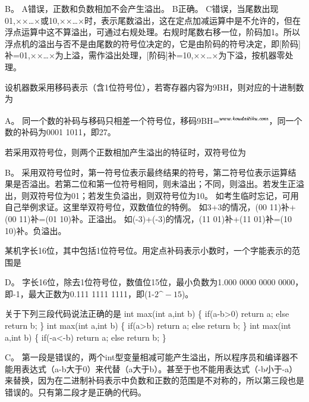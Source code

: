 \begin{solution}B。 A错误，正数和负数相加不会产生溢出。 B正确。
C错误，当尾数出现01,××\ldots{}×或10,××\ldots{}×时，表示尾数溢出，这在定点加减运算中是不允许的，但在浮点运算中这不算溢出，可通过右规处理。右规时尾数右移一位，阶码加1。所以浮点机的溢出与否不是由尾数的符号位决定的，它是由阶码的符号决定，即{[}阶码{]}补=01,××\ldots{}×为上溢，需作溢出处理，{[}阶码{]}补=10,××\ldots{}×为下溢，按机器零处理。
\end{solution}
\question 设机器数采用移码表示（含1位符号位），若寄存器内容为9BH，则对应的十进制数为
\par{}
\begin{solution}A。
同一个数的补码与移码只相差一个符号位，移码9BH=\includegraphics[width=0.86458in,height=0.18750in]{texmath/c89dca5Cdpi7B3507D281001+101129_2}，同一个数的补码为0001
1011，即27。
\end{solution}
\question 若采用双符号位，则两个正数相加产生溢出的特征时，双符号位为
\par{}
\begin{solution}B。
采用双符号位时，第一符号位表示最终结果的符号，第二符号位表示运算结果是否溢出。若第二位和第一位符号相同，则未溢出；不同，则溢出。若发生正溢出，则双符号位为01；若发生负溢出，则双符号位为10。
如考生临时忘记，可用自己举例求证。这里举双符号位，双数值位的特例。
如3+3的情况，(00 11)补+(00 11)补=(01 10)补。正溢出。
如(-3)+(-3)的情况，(11 01)补+(11 01)补=(10 10)补。负溢出。
\end{solution}
\question 某机字长16位，其中包括1位符号位。用定点补码表示小数时，一个字能表示的范围是
\par{}
\begin{solution}D。 字长16位，除去1位符号位，数值位15位，最小负数为1.000 0000 0000
0000，即-1，最大正数为0.111 1111 1111，即(1-$2\^{}-15$)。
\end{solution}
\question 关于下列三段代码说法正确的是 int max(int a,int b) \{
if(a-b\textgreater{}0) return a; else return b; \} int max(int a,int b)
\{ if(a\textgreater{}b) return a; else return b; \} int max(int a,int b)
\{ if(-a\textless{}-b) return a; else return b; \}
\par{}
\begin{solution}C。
第一段是错误的，两个int型变量相减可能产生溢出，所以程序员和编译器不能用表达式（a-b大于0）来代替（a大于b）。甚至于也不能用表达式（-b小于-a）来替换，因为在二进制补码表示中负数和正数的范围是不对称的，所以第三段也是错误的。只有第二段才是正确的代码。
\end{solution}
